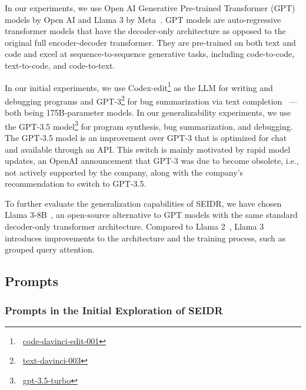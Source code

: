 In our experiments, we use Open AI Generative Pre-trained Transformer (GPT) models by Open AI and Llama 3 by Meta~\cite{roziere2023:code}. 
GPT models are auto-regressive transformer models that have the decoder-only architecture as opposed to the original full encoder-decoder transformer.
They are pre-trained on both text and code and excel at sequence-to-sequence generative tasks, including code-to-code, text-to-code, and code-to-text.

In our initial experiments, we use Codex-edit\footnote{~\href{https://openai.com/index/gpt-3-edit-insert/}{code-davinci-edit-001}} 
as the LLM for writing and debugging programs and GPT-3\footnote{~\href{https://platform.openai.com/docs/deprecations}{text-davinci-003}} for bug summarization via text completion~\cite{brown2020:language} --- both being 175B-parameter models.
In our generalizability experiments, we use the GPT-3.5 model\footnote{~\href{https://platform.openai.com/docs/models/gpt-3-5-turbo}{gpt-3.5-turbo}} for program synthesis, bug summarization, and debugging. 
The GPT-3.5 model is an improvement over GPT-3 that is optimized for chat and available through an API.
This switch is mainly motivated by rapid model updates, an OpenAI announcement that GPT-3 was due to become obsolete, i.e., not actively supported by the company, along with the company's recommendation to switch to GPT-3.5. 

To further evaluate the generalization capabilities of SEIDR, we have chosen Llama 3-8B~\cite{roziere2023:code}, an open-source alternative to GPT models with the same standard decoder-only transformer architecture. 
Compared to Llama 2~\cite{touvron2023:llama}, Llama 3 introduces improvements to the architecture and the training process, such as grouped query attention.

\subsection{Prompts}
\label{sec:seidr-prompts}

\subsubsection{Prompts in the Initial Exploration of SEIDR}
\label{sec:seidr-prompt-strategies}

